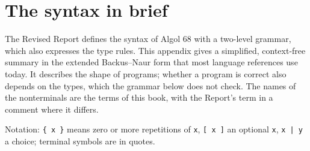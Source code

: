 \chapter{The syntax in brief}\label{app-syntax}

The Revised Report defines the syntax of Algol 68 with a two-level
grammar, which also expresses the type rules. This appendix gives a
simplified, context-free summary in the extended Backus--Naur form that
most language references use today. It describes the shape of programs;
whether a program is correct also depends on the types, which the grammar
below does not check. The names of the nonterminals are the terms of
this book, with the Report's term in a comment where it differs.

Notation: \texttt{\{ x \}} means zero or more repetitions of \texttt{x},
\texttt{[ x ]} an optional \texttt{x}, \texttt{x | y} a choice; terminal
symbols are in quotes.

